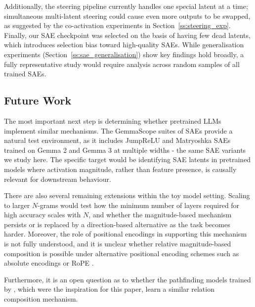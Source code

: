 Additionally, the steering pipeline currently handles one special latent at a time; simultaneous multi-latent steering could cause even more outputs to be swapped, as suggested by the co-activation experiments in Section~\ref{ss:steering_exp}. Finally, our SAE checkpoint was selected on the basis of having few dead latents, which introduces selection bias toward high-quality SAEs. While generalisation experiments (Section~\ref{ss:sae_generalisation}) show key findings hold broadly, a fully representative study would require analysis across random samples of all trained SAEs.

\subsection*{Future Work}

The most important next step is determining whether pretrained LLMs implement similar mechanisms. The GemmaScope suites of SAEs \citep{lieberum2024gemma, mcdougall2025gemmascope2} provide a natural test environment, as it includes JumpReLU and Matryoshka SAEs trained on Gemma 2 and Gemma 3 at multiple widths - the same SAE variants we study here. The specific target would be identifying SAE latents in pretrained models where activation magnitude, rather than feature presence, is causally relevant for downstream behaviour.

There are also several remaining extensions within the toy model setting. Scaling to larger $N$-grams would test how the minimum number of layers required for high accuracy scales with $N$, and whether the magnitude-based mechanism persists or is replaced by a direction-based alternative as the task becomes harder. 
Moreover, the role of positional encodings in supporting this mechanism is not fully understood, and it is unclear whether relative magnitude-based composition is possible under alternative positional encoding schemes such as absolute encodings \citep{radford2019language} or RoPE \citep{su2024roformer}. 


Furthermore, it is an open question as to whether the pathfinding models trained by \citet{brinkmann2024mechanistic}, which were the inspiration for this paper, learn a similar relation composition mechanism.

